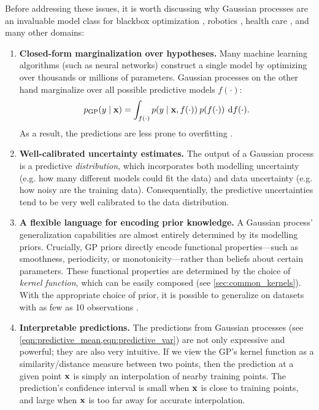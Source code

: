 Before addressing these issues, it is worth discussing why Gaussian processes are an invaluable model class for blackbox optimization \citep[e.g.][]{snoek2012practical}, robotics \citep[e.g.][]{deisenroth2011pilco}, health care \citep[e.g.][]{schulam2015framework}, and many other domains:
\begin{enumerate}
  \item {\bf Closed-form marginalization over hypotheses.}
    Many machine learning algorithms (such as neural networks) construct a single model by optimizing over thousands or millions of parameters.
    Gaussian processes on the other hand marginalize over all possible predictive models $f(\cdot)$:
    \[
      p_\text{GP} ( y \mid \mathbf{x} ) = \int_{f(\cdot)} p( y \mid \mathbf{x}, f(\cdot)) \: p(f(\cdot)) \: \,\mathrm{d}{f}(\cdot).
    \]
    As a result, the predictions are less prone to overfitting \cite{rasmussen2006gaussian}.

  \item {\bf Well-calibrated uncertainty estimates.}
    The output of a Gaussian process is a predictive \emph{distribution}, which incorporates both modelling uncertainty (e.g. how many different models could fit the data) and data uncertainty (e.g. how noisy are the training data).
    Consequentially, the predictive uncertainties tend to be very well calibrated to the data distribution.

  \item {\bf A flexible language for encoding prior knowledge.}
    A Gaussian process' generalization capabilities are almost entirely determined by its modelling priors.
    Crucially, GP priors directly encode functional properties---such as smoothness, periodicity, or monotonicity---rather than beliefs about certain parameters.
    These functional properties are determined by the choice of \emph{kernel function}, which can be easily composed (see \cref{sec:common_kernels}).
    With the appropriate choice of prior, it is possible to generalize on datasets with as few as 10 observations \citep[e.g.][]{rasmussen2006gaussian,gardner2017discovering}.

  \item {\bf Interpretable predictions.}
    The predictions from Gaussian processes (see \cref{eqn:predictive_mean,eqn:predictive_var}) are not only expressive and powerful; they are also very intuitive.
    If we view the GP's kernel function as a similarity/distance measure between two points, then the prediction at a given point $\mathbf{x}$ is simply an interpolation of nearby training points.
    The prediction's confidence interval is small when $\mathbf{x}$ is close to training points, and large when $\mathbf{x}$ is too far away for accurate interpolation.
\end{enumerate}
